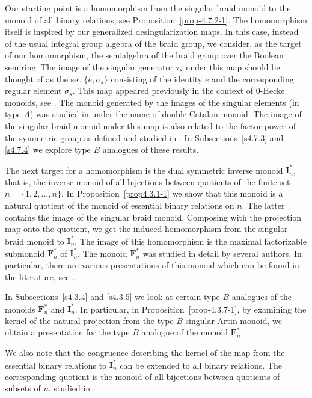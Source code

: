 \documentclass[a4paper]{amsart}
\begin{document}
Our starting point is a homomorphism from the singular braid monoid
to the monoid of all binary relations, see Proposition~\ref{prop-4.7.2-1}.
The homomorphism itself is inspired by our generalized desingularization
maps. In this case, instead of the usual integral group algebra
of the braid group, we consider, as the target of our homomorphism,
the semialgebra of the braid group over the 
Boolean semiring. The image of the singular generator $\tau_s$ under this
map should be thought of as the set $\{e,\sigma_s\}$ consisting of the
identity $e$ and the corresponding regular element $\sigma_s$. This 
map appeared previously in the context of $0$-Hecke monoids, see
\cite{MaSt}. The monoid generated by the images of the singular elements
(in type $A$) was studied in \cite{MaSt} under the name of double Catalan
monoid. The image of the singular braid monoid under this map is also
related to the factor power of the symmetric group as defined and studied in
\cite{GM3,GM4}. In Subsections~\ref{s4.7.3} and \ref{s4.7.4} we explore
type $B$ analogues of these results.

The next target for a homomorphism is the dual symmetric inverse 
monoid $\mathbf{I}^*_n$, that is, the inverse monoid of all bijections 
between quotients of the finite set $\underline{n}=\{1,2,\dots,n\}$.
In Proposition~\ref{prop4.3.1-1} we show that this monoid is a natural
quotient of the monoid of essential binary relations on $\underline{n}$.
The latter contains the image of the singular braid monoid. 
Composing with the projection map onto the quotient, we get the induced
homomorphism from the singular braid monoid to $\mathbf{I}^*_n$.
The image of this homomorphism is the maximal factorizable submonoid 
$\mathbf{F}^*_n$ of $\mathbf{I}^*_n$. The monoid $\mathbf{F}^*_n$ 
was studied in detail by several authors. In particular, there are 
various presentations of this monoid which can be found in the literature,
see \cite{Ea06b,EEF,Fi03}.

In Subsections~\ref{s4.3.4} and \ref{s4.3.5} we look at certain type $B$
analogues of the monoids $\mathbf{F}^*_n$ and $\mathbf{I}^*_n$.
In particular, in Proposition~\ref{prop-4.3.7-1}, by examining the
kernel of the natural projection from the type $B$ singular Artin monoid,
we obtain  a presentation for the type $B$ analogue of the monoid
$\mathbf{F}^*_n$.

We also note that the congruence describing the kernel of the map
from the essential binary relations to  $\mathbf{I}^*_n$ can be
extended to all binary relations. The corresponding quotient is
the monoid of all bijections between quotients of subsets of
$\underline{n}$, studied in \cite{KMU}.
\end{document}
